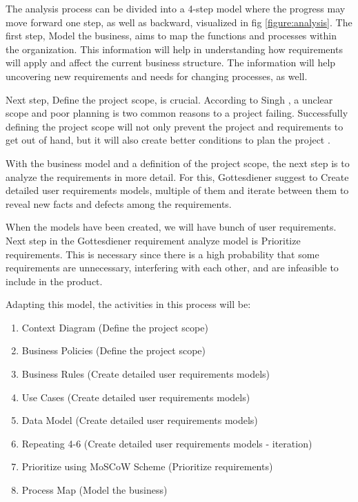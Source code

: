 \documentclass[a4paper]{article}
\begin{document}
The analysis process can be divided into a 4-step model where the progress may move forward one step, as well as backward, visualized in fig \ref{figure:analysis}\cite{gott111}. The first step, Model the business, aims to map the functions and processes within the organization. This information will help in understanding how requirements will apply and affect the current business structure. The information will help uncovering new requirements and needs for changing processes, as well.
 
Next step, Define the project scope, is crucial. According to Singh \cite{projectsmart}, a unclear scope and poor planning is two common reasons to a project failing. Successfully defining the project scope will not only prevent the project and requirements to get out of hand, but it will also create better conditions to plan the project \cite{gott127}. 

With the business model and a definition of the project scope, the next step is to analyze the requirements in more detail. For this, Gottesdiener suggest to Create detailed user requirements models, multiple of them and iterate between them to reveal new facts and defects among the requirements.
        
When the models have been created, we will have bunch of user requirements. Next step in the Gottesdiener requirement analyze model is Prioritize requirements. This is necessary since there is a high probability that some requirements are unnecessary, interfering with each other, and are infeasible to include in the product\cite{Lecture 5}.  

Adapting this model, the activities in this process will be:
\begin{enumerate}
\item Context Diagram (Define the project scope)
\item Business Policies (Define the project scope)
\item Business Rules (Create detailed user requirements models)
\item Use Cases (Create detailed user requirements models)
\item Data Model (Create detailed user requirements models)
\item Repeating 4-6 (Create detailed user requirements models - iteration)
\item Prioritize using MoSCoW Scheme (Prioritize requirements)
\item Process Map (Model the business) 
\end{enumerate}
\end{document}
